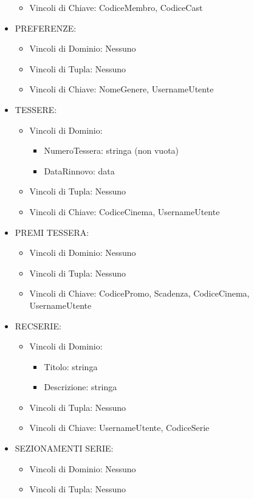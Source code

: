 \documentclass[a4paper,12pt]{report}
\begin{document}
\begin{itemize}
\begin{itemize}
		\item Vincoli di Chiave: CodiceMembro, CodiceCast
	\end{itemize}
	\item PREFERENZE:
	\begin{itemize}
		\item Vincoli di Dominio: Nessuno
		\item Vincoli di Tupla: Nessuno
		\item Vincoli di Chiave: NomeGenere, UsernameUtente
	\end{itemize}
	\item TESSERE:
	\begin{itemize}
		\item Vincoli di Dominio:
		\begin{itemize}
			\item NumeroTessera: stringa (non vuota)
			\item DataRinnovo: data
		\end{itemize}
		\item Vincoli di Tupla: Nessuno
		\item Vincoli di Chiave: CodiceCinema, UsernameUtente
	\end{itemize}
	\item PREMI TESSERA:
	\begin{itemize}
		\item Vincoli di Dominio: Nessuno
		\item Vincoli di Tupla: Nessuno
		\item Vincoli di Chiave: CodicePromo, Scadenza, CodiceCinema, UsernameUtente
	\end{itemize}
	\item RECSERIE:
	\begin{itemize}
		\item Vincoli di Dominio:
		\begin{itemize}
			\item Titolo: stringa
			\item Descrizione: stringa
		\end{itemize}
		\item Vincoli di Tupla: Nessuno
		\item Vincoli di Chiave: UsernameUtente, CodiceSerie
	\end{itemize}
	\item SEZIONAMENTI SERIE:
	\begin{itemize}
		\item Vincoli di Dominio: Nessuno
		\item Vincoli di Tupla: Nessuno

\end{itemize}
\end{itemize}
\end{document}

